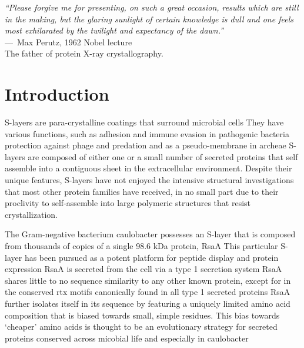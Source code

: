 \acresetall
{}
\begin{epigraph}
  \emph{``Please forgive me for presenting, on such a great occasion, results which are still in the making, but the glaring sunlight of certain knowledge is dull and one feels most exhilarated by the twilight and expectancy of the dawn.''} \\---~Max Perutz, 1962 Nobel lecture\\ The father of protein X-ray crystallography.
\end{epigraph}

\section{Introduction} %
\label{sec:crystal_introduction} 

\Acp{S-layer} are para-crystalline coatings that
surround microbial cells
 They have various functions, such as adhesion
and immune evasion in pathogenic bacteria
 protection against phage and predation
 and as a pseudo-membrane in archeae
 \acp{S-layer} are composed of either one or a small number of secreted proteins that self assemble
into a contiguous sheet in the extracellular environment. Despite their
unique features, \acp{S-layer} have not enjoyed the intensive structural
investigations that most other protein families have received, in no
small part due to their proclivity to self-assemble into large polymeric
structures that resist crystallization.

The Gram-negative bacterium \ac{caulobacter} possesses an
\ac{S-layer} that is composed from thousands of copies of a single 98.6 kDa protein, RsaA
 This particular \ac{S-layer} has been pursued as a potent platform for peptide display and
protein expression
RsaA is secreted from the cell via a type 1
secretion system
 RsaA shares little to no sequence similarity to any
other known protein, except for in the conserved \ac{rtx}
motifs canonically found in all type 1 secreted proteins
 RsaA further isolates itself in its sequence by featuring a uniquely limited amino
acid composition that is biased towards small, simple residues. This bias
towards `cheaper' amino acids is thought to be an evolutionary strategy
for secreted proteins conserved across micobial life and especially in
\ac{caulobacter}

